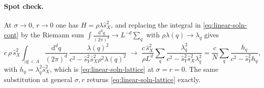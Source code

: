 \documentclass[11pt,a4paper]{article}
\newcommand{\dd}{\mathrm d}
\newcommand{\Lam}{\Lambda}
\newcommand{\sX}{\hat s_X}
\newcommand{\sY}{\hat s_Y}
\newcommand{\ball}[1]{\int_{|q|<\Lam}\frac{\dd^d q}{(2\pi)^d}\,#1}
\begin{document}
\paragraph{Spot check.}
At $\sigma\to0$, $r\to0$ one has $H = \rho\lambda\sX^2$, and replacing the integral in \eqref{eq:linear-soln-cont} by the Riemann sum $\int\frac{\dd^dq}{(2\pi)^d}\to L^{-d}\sum_q$ with $\rho\lambda(q)\to\lambda_q$ gives
\begin{equation}
  c\,\rho\,\sX^2\ball{\frac{\lambda(q)^2}{c^2-\sY^2\sX^2\rho^2\lambda(q)^2}}
  \;\to\;
  \frac{c\,\sX^2}{\rho L^d}\sum_q\frac{\lambda_q^2}{c^2-\sY^2\sX^2\lambda_q^2}
  = \frac cN\sum_q\frac{h_q}{c^2-\sY^2h_q},
\end{equation}
with $h_q = \lambda_q^2\sX^2$, which is \eqref{eq:linear-soln-lattice} at $\sigma = r = 0$. The same substitution at general $\sigma, r$ returns \eqref{eq:linear-soln-lattice} exactly.
\end{document}
